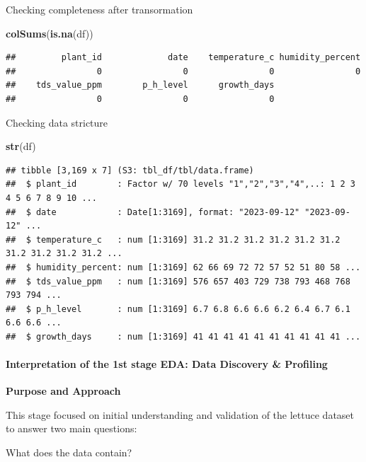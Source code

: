 \documentclass[
]{article}
\newenvironment{Shaded}{\begin{snugshade}}{\end{snugshade}}
\newcommand{\FunctionTok}[1]{\textcolor[rgb]{0.13,0.29,0.53}{\textbf{#1}}}
\newcommand{\NormalTok}[1]{#1}
\begin{document}
Checking completeness after transormation

\begin{Shaded}
\begin{Highlighting}[]
\FunctionTok{colSums}\NormalTok{(}\FunctionTok{is.na}\NormalTok{(df))}
\end{Highlighting}
\end{Shaded}

\begin{verbatim}
##         plant_id             date    temperature_c humidity_percent 
##                0                0                0                0 
##    tds_value_ppm        p_h_level      growth_days 
##                0                0                0
\end{verbatim}

Checking data stricture

\begin{Shaded}
\begin{Highlighting}[]
\FunctionTok{str}\NormalTok{(df)}
\end{Highlighting}
\end{Shaded}

\begin{verbatim}
## tibble [3,169 x 7] (S3: tbl_df/tbl/data.frame)
##  $ plant_id        : Factor w/ 70 levels "1","2","3","4",..: 1 2 3 4 5 6 7 8 9 10 ...
##  $ date            : Date[1:3169], format: "2023-09-12" "2023-09-12" ...
##  $ temperature_c   : num [1:3169] 31.2 31.2 31.2 31.2 31.2 31.2 31.2 31.2 31.2 31.2 ...
##  $ humidity_percent: num [1:3169] 62 66 69 72 72 57 52 51 80 58 ...
##  $ tds_value_ppm   : num [1:3169] 576 657 403 729 738 793 468 768 793 794 ...
##  $ p_h_level       : num [1:3169] 6.7 6.8 6.6 6.6 6.2 6.4 6.7 6.1 6.6 6.6 ...
##  $ growth_days     : num [1:3169] 41 41 41 41 41 41 41 41 41 41 ...
\end{verbatim}

\paragraph{Interpretation of the 1st stage EDA: Data Discovery \&
Profiling}\label{interpretation-of-the-1st-stage-eda-data-discovery-profiling}

\textbf{Purpose and Approach}

This stage focused on initial understanding and validation of the
lettuce dataset to answer two main questions:

What does the data contain?
\end{document}
